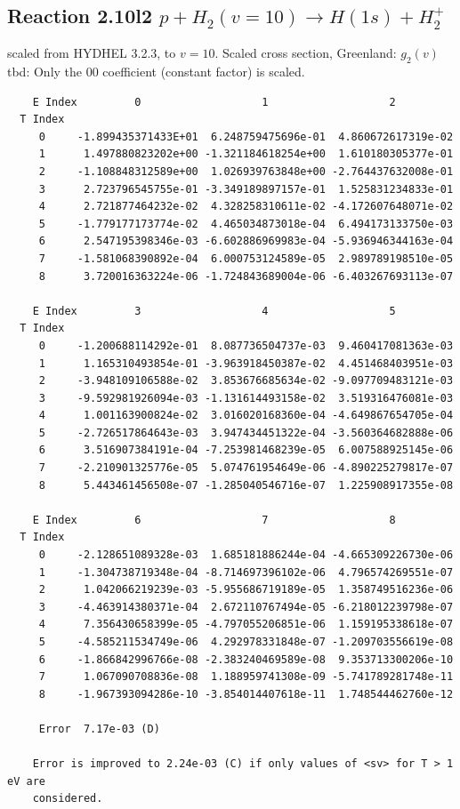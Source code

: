 \documentclass[12pt,dvipdfmx]{article}
\begin{document}
\subsection{
Reaction 2.10l2 $   p + H_2(v=10) \rightarrow H(1s) + H_2^+$}
scaled from HYDHEL 3.2.3, to $v=10$. Scaled cross section, Greenland: $g_2(v)$
tbd:
Only the 00 coefficient (constant factor) is scaled.


\begin{small}\begin{verbatim}
    E Index         0                   1                   2
  T Index
     0     -1.899435371433E+01  6.248759475696e-01  4.860672617319e-02
     1      1.497880823202e+00 -1.321184618254e+00  1.610180305377e-01
     2     -1.108848312589e+00  1.026939763848e+00 -2.764437632008e-01
     3      2.723796545755e-01 -3.349189897157e-01  1.525831234833e-01
     4      2.721877464232e-02  4.328258310611e-02 -4.172607648071e-02
     5     -1.779177173774e-02  4.465034873018e-04  6.494173133750e-03
     6      2.547195398346e-03 -6.602886969983e-04 -5.936946344163e-04
     7     -1.581068390892e-04  6.000753124589e-05  2.989789198510e-05
     8      3.720016363224e-06 -1.724843689004e-06 -6.403267693113e-07

    E Index         3                   4                   5
  T Index
     0     -1.200688114292e-01  8.087736504737e-03  9.460417081363e-03
     1      1.165310493854e-01 -3.963918450387e-02  4.451468403951e-03
     2     -3.948109106588e-02  3.853676685634e-02 -9.097709483121e-03
     3     -9.592981926094e-03 -1.131614493158e-02  3.519316476081e-03
     4      1.001163900824e-02  3.016020168360e-04 -4.649867654705e-04
     5     -2.726517864643e-03  3.947434451322e-04 -3.560364682888e-06
     6      3.516907384191e-04 -7.253981468239e-05  6.007588925145e-06
     7     -2.210901325776e-05  5.074761954649e-06 -4.890225279817e-07
     8      5.443461456508e-07 -1.285040546716e-07  1.225908917355e-08

    E Index         6                   7                   8
  T Index
     0     -2.128651089328e-03  1.685181886244e-04 -4.665309226730e-06
     1     -1.304738719348e-04 -8.714697396102e-06  4.796574269551e-07
     2      1.042066219239e-03 -5.955686719189e-05  1.358749516236e-06
     3     -4.463914380371e-04  2.672110767494e-05 -6.218012239798e-07
     4      7.356430658399e-05 -4.797055206851e-06  1.159195338618e-07
     5     -4.585211534749e-06  4.292978331848e-07 -1.209703556619e-08
     6     -1.866842996766e-08 -2.383240469589e-08  9.353713300206e-10
     7      1.067090708836e-08  1.188959741308e-09 -5.741789281748e-11
     8     -1.967393094286e-10 -3.854014407618e-11  1.748544462760e-12

     Error  7.17e-03 (D)

    Error is improved to 2.24e-03 (C) if only values of <sv> for T > 1 eV are
    considered.
\end{verbatim}\end{small}
\newpage
\end{document}
